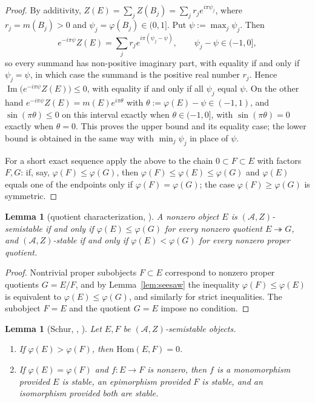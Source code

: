 \documentclass[12pt]{amsart}
\newtheorem{lemma}[theorem]{Lemma}
\numberwithin{theorem}{section}
\theoremstyle{definition}
\newcommand{\calA}{\mathcal{A}}
\newcommand{\Hom}{\mathrm{Hom}}
\newcommand{\im}{\operatorname{Im}}
\begin{document}
	\begin{proof}
		By additivity, $Z(E) = \sum_j Z(B_j) = \sum_j r_j e^{i \pi \psi_j}$, where $r_j = m(B_j) > 0$ and $\psi_j = \varphi(B_j) \in (0, 1]$. Put $\psi := \max_j \psi_j$. Then
		\[
		e^{-i \pi \psi} Z(E) = \sum_j r_j e^{i \pi (\psi_j - \psi)}, \qquad \psi_j - \psi \in (-1, 0],
		\]
		so every summand has non-positive imaginary part, with equality if and only if $\psi_j = \psi$, in which case the summand is the positive real number $r_j$. 
		Hence $\im \big( e^{-i \pi \psi} Z(E) \big) \leqslant 0$, with equality if and only if all $\psi_j$ equal $\psi$. On the other hand $e^{-i \pi \psi} Z(E) = m(E) e^{i \pi \theta}$ with $\theta := \varphi(E) - \psi \in (-1, 1)$, and $\sin(\pi \theta) \leqslant 0$ on this interval exactly when $\theta \in (-1, 0]$, with $\sin(\pi \theta) = 0$ exactly when $\theta = 0$. This proves the upper bound and its equality case; the lower bound is obtained in the same way with $\min_j \psi_j$ in place of $\psi$.
		
		For a short exact sequence apply the above to the chain $0 \subset F \subset E$ with factors $F, G$: if, say, $\varphi(F) \leqslant \varphi(G)$, then $\varphi(F) \leqslant \varphi(E) \leqslant \varphi(G)$ and $\varphi(E)$ equals one of the endpoints only if $\varphi(F) = \varphi(G)$; the case $\varphi(F) \geqslant \varphi(G)$ is symmetric.
	\end{proof}
	
	\begin{lemma}[quotient characterization, {\cite[Exercise~4.4]{MS17}}]
		\label{lem:quotients}
		A nonzero object $E$ is $(\calA, Z)$-semistable 
		if and only if $\varphi(E) \leqslant \varphi(G)$ for every nonzero quotient $E \twoheadrightarrow G$, 
		and $(\calA, Z)$-stable if and only if $\varphi(E) < \varphi(G)$ for every nonzero proper quotient.
	\end{lemma}
	
	\begin{proof}
		Nontrivial proper subobjects $F \subset E$ correspond to nonzero proper quotients $G = E / F$, 
		and by Lemma~\ref{lem:seesaw} 
		the inequality $\varphi(F) \leqslant \varphi(E)$ is equivalent to $\varphi(E) \leqslant \varphi(G)$, 
		and similarly for strict inequalities. 
		The subobject $F = E$ and the quotient $G = E$ impose no condition.
	\end{proof}
	
	\begin{lemma}[Schur, {\cite[Thm~1]{Rud97}}, {\cite[Lemma~4.5]{MS17}}]
		\label{lem:schur}
		Let $E, F$ be $(\calA, Z)$-semistable objects.
		\begin{enumerate}
			\item If $\varphi(E) > \varphi(F)$, then $\Hom(E, F) = 0$.
			\item If $\varphi(E) = \varphi(F)$ and $f \colon E \to F$ is nonzero, then $f$ is a monomorphism provided $E$ is stable, an epimorphism provided $F$ is stable, and an isomorphism provided both are stable.
		\end{enumerate}
	\end{lemma}
	
\end{document}
